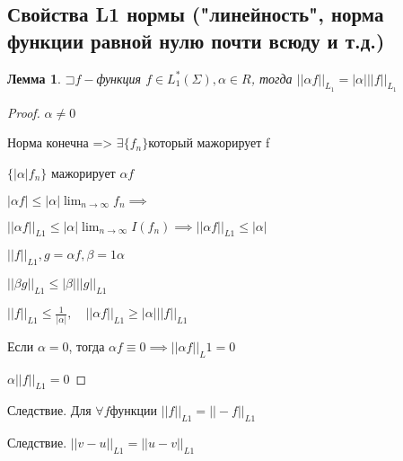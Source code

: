 \documentclass[a4paper]{article}
\newcommand\letsymbol{\mathord{\sqsupset}}
\newtheorem{lemma}{Лемма}[section]
\theoremstyle{definition}
\theoremstyle{remark}
\begin{document}
    \subsection{ Свойства L1 нормы ("линейность", норма функции равной нулю почти всюду и т.д.)}\begin{lemma}
     $\letsymbol f-$функция $f\in L_1^*(\Sigma), \alpha\in R$, тогда $||\alpha f||_{L_1} = |\alpha|||f||_{L_1}$

\end{lemma}
\begin{proof}
     $\alpha \neq 0$

     Норма конечна => $\exists \{f_n\}$который мажорирует f 
     
     $\{|\alpha|f_n\}$ мажорирует $\alpha f$

     $|\alpha f|\leq |\alpha|\lim_{n\to\infty} f_n\implies$

     $||\alpha f||_{L1}\leq |\alpha|\lim_{n\to\infty} I(f_n)\implies ||\alpha f||_{L1}\leq |\alpha|$

     $||f||_{L1}, g = \alpha f, \beta = 1\alpha$

     $||\beta g||_{L1}\leq |\beta|||g||_{L1}$

     $||f||_{L1}\leq \frac{1}{|\alpha|}, \quad ||\alpha f||_{L1} \geq |\alpha|||f||_{L1}$

     Если $\alpha = 0$, тогда $\alpha f\equiv 0\implies ||\alpha f||_L1 = 0$

     $\alpha ||f||_{L1} = 0$
\end{proof}
Следствие. Для $\forall f$функции $||f||_{L1} = ||-f||_{L1}$

Следствие. $||v - u||_{L1} = ||u - v||_{L1}$
\end{document}
